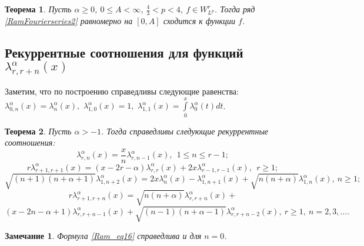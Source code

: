 \documentclass[a4paper,12pt]{article}
\newtheorem{theorem}{Теорема}
\newtheorem{remark}{Замечание}
\begin{document}
\begin{theorem}\label{Ram_thm1}
Пусть $\alpha\geq0$, $0\leq A<\infty$, $\frac{4}{3}<p<4$, $f\in W^r_{L^p}$. Тогда ряд \eqref{RamFourierseries2} равномерно на $[0, A]$ сходится к функции $f$.
\end{theorem}

\subsection{Рекуррентные соотношения для функций $\lambda_{r,r+n}^{\alpha}(x)$}\label{Ram_sec4}
Заметим, что по построению справедливы следующие равенства: $\lambda_{0,n}^\alpha(x)=\lambda_{n}^\alpha(x),$ $\lambda_{1,0}^\alpha(x)=1,$ $\lambda_{1,1}^\alpha(x)=\int\limits_0^x\lambda^\alpha_0(t)dt$.

\begin{theorem}\label{Ram_thm2}
Пусть $\alpha>-1$. Тогда справедливы следующие рекуррентные соотношения:
\begin{equation*}
\lambda_{r,n}^\alpha(x)=\frac{x}{n}\lambda_{r,n-1}^\alpha(x), \ \ 1\leq n\leq r-1;
\end{equation*}
\begin{equation*}
r\lambda_{r+1,r+1}^\alpha(x)=(x-2r-\alpha)\lambda_{r,r}^\alpha(x)+2x\lambda_{r-1,r-1}^\alpha(x), \ \ r\geq 1;
\end{equation*}
\begin{equation}\label{Ram_eq16}
\sqrt{(n+1)(n+\alpha+1)}\lambda_{1,n+2}^\alpha(x)= 2x\lambda_{n}^{\alpha}(x)-\lambda_{1,n+1}^{\alpha}(x)+
\sqrt{n(n+\alpha)} \lambda_{1,n}^{\alpha}(x), \ n\geq 1;
\end{equation}
$$
r\lambda_{r+1,r+n}^\alpha(x)=\sqrt{n(n+\alpha)}\lambda_{r,r+n}^{\alpha}(x)+
$$
\begin{equation*}
\left(x - 2n-\alpha+1\right)\lambda_{r,r+n-1}^{\alpha}(x)
+\sqrt{(n-1)(n+\alpha-1)}\lambda_{r,r+n-2}^{\alpha}(x), \ r\geq 1, \ n=2, 3, \ldots.
\end{equation*}
\end{theorem}

\begin{remark}
Формула \eqref{Ram_eq16} справедлива и для $n=0$.
\end{remark}
\end{document}
